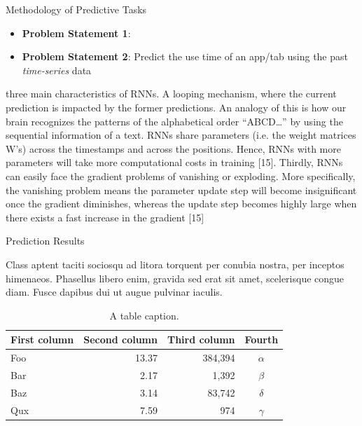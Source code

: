 \documentclass[final]{beamer}
\newlength{\colwidth}
\begin{document}
\begin{frame}[t]
\begin{columns}[t]
\begin{column}{\colwidth}
\begin{exampleblock}{Methodology of Predictive Tasks}

    \begin{itemize}
       \item \textbf{Problem Statement 1}:
       \item \textbf{Problem Statement 2}: Predict the use time of an app/tab using the past \textit{time-series} data
       \end{itemize}

       three main characteristics of RNNs. 
A looping mechanism, where the current prediction is impacted by the former predictions. 
An analogy of this is how our brain recognizes the patterns of the alphabetical order “ABCD…” by using the sequential information of a text. 
RNNs share parameters (i.e. the weight matrices W’s) across the timestamps and across the positions. 
Hence, RNNs with more parameters will take more computational costs in training [15]. 
Thirdly, RNNs can easily face the gradient problems of vanishing or exploding. 
More specifically, the vanishing problem means the parameter update step will become insignificant once the gradient diminishes, whereas the update step becomes highly large when there exists a fast increase in the gradient [15]

    \end{exampleblock}

    \begin{block}{Prediction Results}

    Class aptent taciti sociosqu ad litora torquent per conubia nostra, per
    inceptos himenaeos. Phasellus libero enim, gravida sed erat sit amet,
    scelerisque congue diam. Fusce dapibus dui ut augue pulvinar iaculis.

    \begin{table}
      \centering
      \begin{tabular}{l r r c}
        \toprule
        \textbf{First column} & \textbf{Second column} & \textbf{Third column} & \textbf{Fourth} \\
        \midrule
        Foo & 13.37 & 384,394 & $\alpha$ \\
        Bar & 2.17 & 1,392 & $\beta$ \\
        Baz & 3.14 & 83,742 & $\delta$ \\
        Qux & 7.59 & 974 & $\gamma$ \\
        \bottomrule
      \end{tabular}
      \caption{A table caption.}
    \end{table}


\end{block}
\end{column}
\end{columns}
\end{frame}
\end{document}
